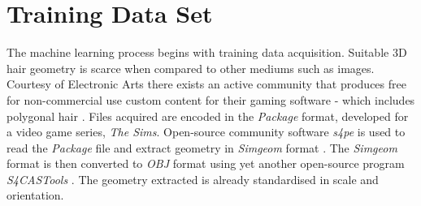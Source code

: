 \documentclass[ %
author={Dillon Keith Diep},
supervisor={Dr. Carl Henrik Ek},
degree={MEng},
title={ART-CG Hair:},
subtitle={Assisted Real-time Content Generation of Stylised Virtual Hair},
type={Research},
year={2017} ]{dissertation}
\begin{document}
\section{Training Data Set}
The machine learning process begins with training data acquisition. Suitable 3D hair geometry is scarce when compared to other mediums such as images. Courtesy of Electronic Arts there exists an active community that produces free for non-commercial use custom content for their gaming software - which includes polygonal hair \cite{tsr}. Files acquired are encoded in the \textit{Package} format, developed for a video game series, \textit{The Sims}. Open-source community software \textit{s4pe} is used to read the \textit{Package} file and extract geometry in \textit{Simgeom} format \cite{s4pe}. The \textit{Simgeom} format is then converted to \textit{OBJ} format using yet another open-source program \textit{S4CASTools} \cite{s4cas}. The geometry extracted is already standardised in scale and orientation.
\end{document}
